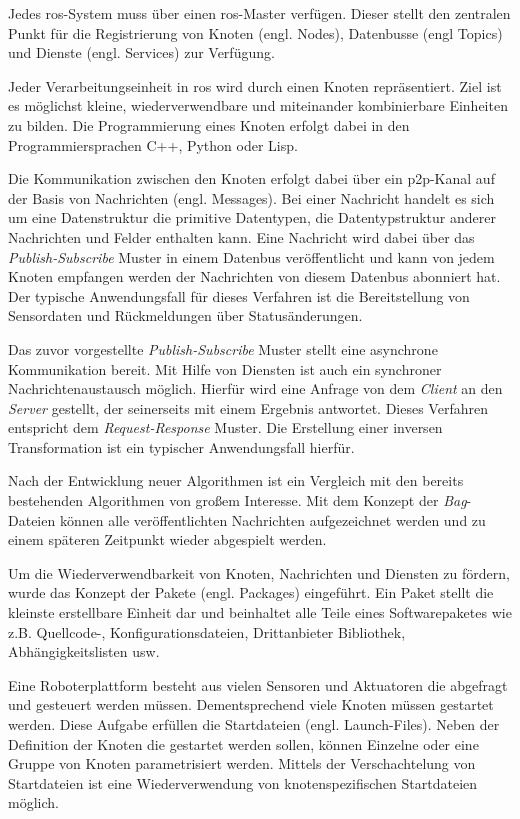 Jedes \Gls{ros}-System muss über einen \Gls{ros}-Master verfügen. Dieser stellt den zentralen Punkt für die Registrierung von Knoten (engl. Nodes), Datenbusse (engl Topics) und Dienste (engl. Services) zur Verfügung.

Jeder Verarbeitungseinheit in \Gls{ros} wird durch einen Knoten repräsentiert. Ziel ist es möglichst kleine, wiederverwendbare und miteinander kombinierbare Einheiten zu bilden. Die Programmierung eines Knoten erfolgt dabei in den Programmiersprachen C++, Python oder Lisp.

Die Kommunikation zwischen den Knoten erfolgt dabei über ein \Gls{p2p}-Kanal auf der Basis von Nachrichten (engl. Messages). Bei einer Nachricht handelt es sich um eine Datenstruktur die primitive Datentypen, die Datentypstruktur anderer Nachrichten und Felder enthalten kann. Eine Nachricht wird dabei über das \textit{Publish-Subscribe} Muster in einem Datenbus veröffentlicht und kann von jedem Knoten empfangen werden der Nachrichten von diesem Datenbus abonniert hat. Der typische Anwendungsfall für dieses Verfahren ist die Bereitstellung von Sensordaten und Rückmeldungen über Statusänderungen.

Das zuvor vorgestellte \textit{Publish-Subscribe} Muster stellt eine asynchrone Kommunikation bereit. Mit Hilfe von Diensten ist auch ein synchroner Nachrichtenaustausch möglich. Hierfür wird eine Anfrage von dem \textit{Client} an den \textit{Server} gestellt, der seinerseits mit einem Ergebnis antwortet. Dieses Verfahren entspricht dem \textit{Request-Response} Muster. Die Erstellung einer inversen Transformation ist ein typischer Anwendungsfall hierfür.

Nach der Entwicklung neuer Algorithmen ist ein Vergleich mit den bereits bestehenden Algorithmen von großem Interesse. Mit dem Konzept der \textit{Bag}-Dateien können alle veröffentlichten Nachrichten aufgezeichnet werden und zu einem späteren Zeitpunkt wieder abgespielt werden.

Um die Wiederverwendbarkeit von Knoten, Nachrichten und Diensten zu fördern, wurde das Konzept der Pakete (engl. Packages) eingeführt. Ein Paket stellt die kleinste erstellbare Einheit dar und beinhaltet alle Teile eines Softwarepaketes wie z.B. Quellcode-, Konfigurationsdateien, Drittanbieter Bibliothek, Abhängigkeitslisten usw.

Eine Roboterplattform besteht aus vielen Sensoren und Aktuatoren die abgefragt und gesteuert werden müssen. Dementsprechend viele Knoten müssen gestartet werden. Diese Aufgabe erfüllen die Startdateien (engl. Launch-Files). Neben der Definition der Knoten die gestartet werden sollen, können Einzelne oder eine Gruppe von Knoten parametrisiert werden. Mittels der Verschachtelung von Startdateien ist eine Wiederverwendung von knotenspezifischen Startdateien möglich.

